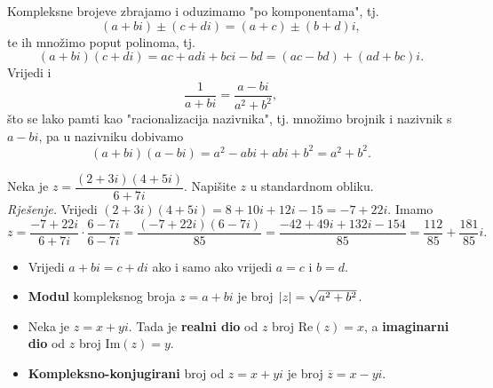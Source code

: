 \noindent Kompleksne brojeve zbrajamo i oduzimamo "po komponentama", tj. $$(a+bi)\pm (c+di)=(a+c)\pm (b+d)i,$$ te ih množimo poput polinoma, tj. $$(a+bi)(c+di)=ac+adi+bci-bd=(ac-bd)+(ad+bc)i.$$ Vrijedi i $$\dfrac{1}{a+bi}=\dfrac{a-bi}{a^2+b^2},$$ što se lako pamti kao "racionalizacija nazivnika", tj. množimo brojnik i nazivnik s $a-bi$, pa u nazivniku dobivamo $$(a+bi)(a-bi)=a^2-abi+abi+b^2=a^2+b^2.$$
\begin{exercise}
Neka je $z=\dfrac{(2+3i)(4+5i)}{6+7i}$. Napišite $z$ u standardnom obliku.\\
\textit{Rješenje.} Vrijedi $(2+3i)(4+5i)=8+10i+12i-15=-7+22i$. Imamo
$$z=\dfrac{-7+22i}{6+7i}\cdot \dfrac{6-7i}{6-7i}=\dfrac{(-7+22i)(6-7i)}{85}=\dfrac{-42+49i+132i-154}{85}=\dfrac{112}{85}+\dfrac{181}{85}i.$$
\end{exercise}
\begin{remark} \textbf{}
\label{18}
\begin{itemize}
\item Vrijedi $a+bi=c+di$ ako i samo ako vrijedi $a=c$ i $b=d$.
\item \textbf{Modul} kompleksnog broja $z=a+bi$ je broj $\;\abs{z}=\sqrt{a^2+b^2}$.
\item Neka je $z=x+yi$. Tada je \textbf{realni dio} od $z$ broj $\mathrm{Re}(z)=x$, a \textbf{imaginarni dio} od $z$ broj $\mathrm{Im}(z)=y$.
\item \textbf{Kompleksno-konjugirani} broj od $z=x+yi$ je broj $\overline{z}=x-yi$.
\end{itemize}
\end{remark}

